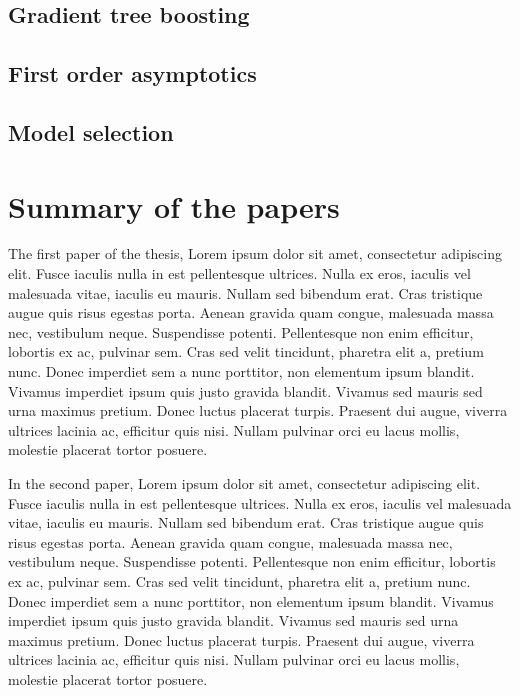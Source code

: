 





\section{Gradient tree boosting}
\label{sec:gradient tree boosting}



\section{First order asymptotics}


\section{Model selection}




\chapter{Summary of the papers}

The first paper of the thesis, Lorem ipsum dolor sit amet, consectetur adipiscing elit. Fusce iaculis nulla in est pellentesque ultrices. Nulla ex eros, iaculis vel malesuada vitae, iaculis eu mauris. Nullam sed bibendum erat. Cras tristique augue quis risus egestas porta. Aenean gravida quam congue, malesuada massa nec, vestibulum neque. Suspendisse potenti. Pellentesque non enim efficitur, lobortis ex ac, pulvinar sem. Cras sed velit tincidunt, pharetra elit a, pretium nunc. Donec imperdiet sem a nunc porttitor, non elementum ipsum blandit. Vivamus imperdiet ipsum quis justo gravida blandit. Vivamus sed mauris sed urna maximus pretium. Donec luctus placerat turpis. Praesent dui augue, viverra ultrices lacinia ac, efficitur quis nisi. Nullam pulvinar orci eu lacus mollis, molestie placerat tortor posuere.


In the second paper, Lorem ipsum dolor sit amet, consectetur adipiscing elit. Fusce iaculis nulla in est pellentesque ultrices. Nulla ex eros, iaculis vel malesuada vitae, iaculis eu mauris. Nullam sed bibendum erat. Cras tristique augue quis risus egestas porta. Aenean gravida quam congue, malesuada massa nec, vestibulum neque. Suspendisse potenti. Pellentesque non enim efficitur, lobortis ex ac, pulvinar sem. Cras sed velit tincidunt, pharetra elit a, pretium nunc. Donec imperdiet sem a nunc porttitor, non elementum ipsum blandit. Vivamus imperdiet ipsum quis justo gravida blandit. Vivamus sed mauris sed urna maximus pretium. Donec luctus placerat turpis. Praesent dui augue, viverra ultrices lacinia ac, efficitur quis nisi. Nullam pulvinar orci eu lacus mollis, molestie placerat tortor posuere.


